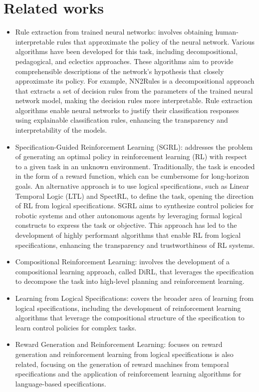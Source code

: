 \documentclass[runningheads]{llncs}
\begin{document}
\section{Related works}

\begin{itemize}
    \item Rule extraction from trained neural networks: involves obtaining human-interpretable rules that approximate the policy of the neural network. Various algorithms have been developed for this task, including decompositional, pedagogical, and eclectics approaches. These algorithms aim to provide comprehensible descriptions of the network's hypothesis that closely approximate its policy. For example, NN2Rules is a decompositional approach that extracts a set of decision rules from the parameters of the trained neural network model, making the decision rules more interpretable. Rule extraction algorithms enable neural networks to justify their classification responses using explainable classification rules, enhancing the transparency and interpretability of the models\cite{Hailesilassie2016}\cite{Sato2001}\cite{Lal2022}.
    \item Specification-Guided Reinforcement Learning (SGRL): addresses the problem of generating an optimal policy in reinforcement learning (RL) with respect to a given task in an unknown environment. Traditionally, the task is encoded in the form of a reward function, which can be cumbersome for long-horizon goals. An alternative approach is to use logical specifications, such as Linear Temporal Logic (LTL) and SpectRL, to define the task, opening the direction of RL from logical specifications. SGRL aims to synthesize control policies for robotic systems and other autonomous agents by leveraging formal logical constructs to express the task or objective. This approach has led to the development of highly performant algorithms that enable RL from logical specifications, enhancing the transparency and trustworthiness of RL systems\cite{Bansal2022}\cite{Jothimurugan2023}.
    \item Compositional Reinforcement Learning: involves the development of a compositional learning approach, called DiRL, that leverages the specification to decompose the task into high-level planning and reinforcement learning\cite{Bansal2022}\cite{Jothimurugan2021}.
    \item Learning from Logical Specifications: covers the broader area of learning from logical specifications, including the development of reinforcement learning algorithms that leverage the compositional structure of the specification to learn control policies for complex tasks\cite{Jothimurugan2021}.
    \item Reward Generation and Reinforcement Learning: focuses on reward generation and reinforcement learning from logical specifications is also related, focusing on the generation of reward machines from temporal specifications and the application of reinforcement learning algorithms for language-based specifications\cite{Jothimurugan2021}.
\end{itemize}
\end{document}
